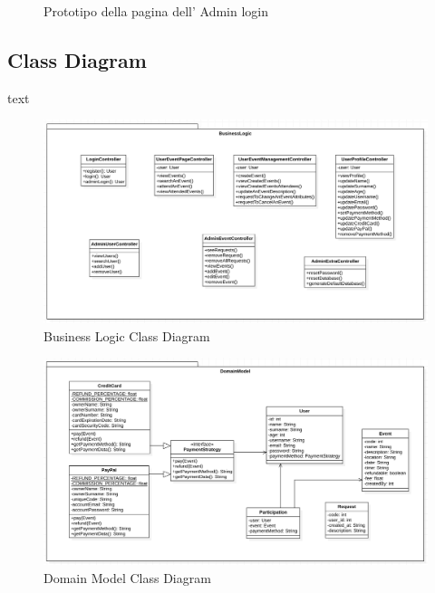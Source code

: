 \documentclass[11pt]{article}
\begin{document}
            \setlength{\fboxsep}{10pt}
            \begin{figure}[H]
                \centering
                \setlength{\fboxsep}{10pt} %
                \caption{Prototipo della pagina dell' Admin login}
                \label{fig:mockup-1.3}
            \end{figure}


    \subsection{Class Diagram} \label{subsec:class-diagram}

            text


            \begin{figure}[H]
                \centering
                \includegraphics[width=\textwidth]{class_diagram/business_logic_tmp}
                \caption{Business Logic Class Diagram}
                \label{fig:business-logic-class-diagram}
            \end{figure}

            \begin{figure}[H]
                \centering
                \includegraphics[width=\textwidth]{class_diagram/domain_model_tmp}
                \caption{Domain Model Class Diagram}
                \label{fig:domain-model-class-diagram}
            \end{figure}
\end{document}

